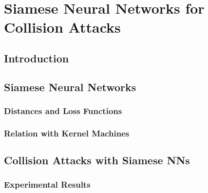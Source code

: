 
\chapter{Siamese Neural Networks for Collision Attacks} %

\label{ChapterNNforDimRed}


\section{Introduction}


\section{Siamese Neural Networks}
\subsection{Distances and Loss Functions}
\subsection{Relation with Kernel Machines}


\section{Collision Attacks with Siamese NNs}
\subsection{Experimental Results}
